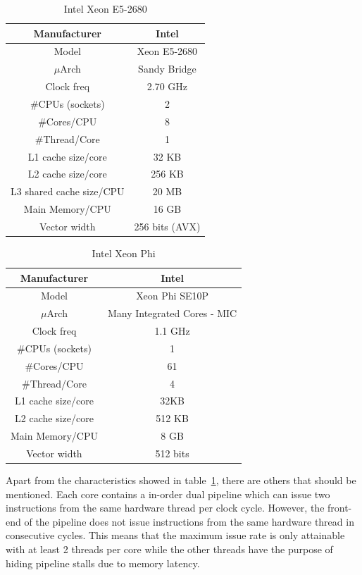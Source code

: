 \documentclass[abstract=on,9pt,twocolumn]{scrartcl}
\begin{document}
\begin{table}[H]
\centering
\footnotesize
\begin{tabular}{| c | c |}\hline
Manufacturer & Intel\\ \hline
Model & Xeon E5-2680\\ \hline
$\mu$Arch & Sandy Bridge\\ \hline
Clock freq & 2.70 GHz\\ \hline
\#CPUs (sockets) & 2 \\ \hline
\#Cores/CPU & 8\\ \hline
\#Thread/Core & 1\\ \hline
L1 cache size/core & 32 KB\\ \hline
L2 cache size/core & 256 KB\\ \hline
L3 shared cache size/CPU & 20 MB\\ \hline
Main Memory/CPU & 16 GB\\ \hline
Vector width & 256 bits (AVX)\\ \hline
\end{tabular}
\caption{Intel Xeon E5-2680}
\end{table}

\begin{table}[H]
\centering
\footnotesize
\begin{tabular}{| c | c |}\hline
Manufacturer & Intel\\ \hline
Model & Xeon Phi SE10P\\ \hline
$\mu$Arch & Many Integrated Cores - MIC\\ \hline
Clock freq & 1.1 GHz\\ \hline
\#CPUs (sockets) & 1 \\ \hline
\#Cores/CPU & 61\\ \hline
\#Thread/Core & 4\\ \hline
L1 cache size/core & 32KB\\ \hline
L2 cache size/core & 512 KB\\ \hline
Main Memory/CPU & 8 GB\\ \hline
Vector width & 512 bits\\ \hline
\end{tabular}
\label{MIC}
\caption{Intel Xeon Phi}
\end{table}




Apart from the characteristics showed in table~\ref{MIC}, there are
others that should be mentioned. Each core contains a in-order dual
pipeline which can issue two instructions from the same hardware thread
per clock cycle. However, the front-end of the pipeline does not issue
instructions from the same hardware thread in consecutive cycles.
This means that the maximum issue rate is only attainable with at least
2 threads per core while the other threads have the purpose of hiding
pipeline stalls due to memory latency. %
\end{document}
